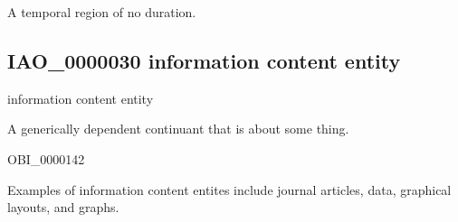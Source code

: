 \documentclass[letterpaper,10pt,english]{sphinxmanual}
\begin{document}
\begin{sphinxShadowBox}

\sphinxAtStartPar
A temporal region of no duration.
\end{sphinxShadowBox}

\begin{sphinxShadowBox}

\sphinxAtStartPar
{}
\end{sphinxShadowBox}
\begin{quote}

\ignorespaces \end{quote}


\subsection{IAO\_0000030 \sphinxhyphen{} information content entity}
\label{\detokenize{doc-IAO_0000030:iao-0000030-information-content-entity}}\label{\detokenize{doc-IAO_0000030:index-0}}\label{\detokenize{doc-IAO_0000030::doc}}
\begin{sphinxShadowBox}

\sphinxAtStartPar
information content entity
\end{sphinxShadowBox}

\begin{sphinxShadowBox}

\sphinxAtStartPar
A generically dependent continuant that is about some thing.
\end{sphinxShadowBox}

\begin{sphinxShadowBox}

\sphinxAtStartPar
OBI\_0000142
\end{sphinxShadowBox}

\begin{sphinxShadowBox}

\sphinxAtStartPar
Examples of information content entites include journal articles, data, graphical layouts, and graphs.
\end{sphinxShadowBox}
\end{document}
